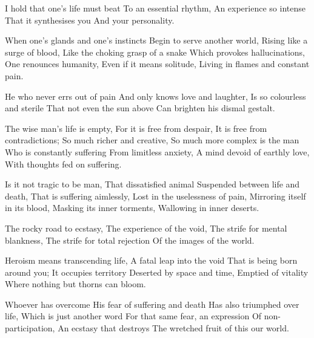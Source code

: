 \documentclass{article}
\newenvironment{stanza}{\begin{minipage}{10cm}\obeylines}{\end{minipage}\vspace{\baselineskip}}
\begin{document}
\begin{stanza}
I hold that one's life must beat
To an essential rhythm,
An experience so intense
That it synthesises you
And your personality.
\end{stanza}

\begin{stanza}
When one's glands and one's instincts 
Begin to serve another world,
Rising like a surge of blood,
Like the choking grasp of a snake
Which provokes hallucinations,
One renounces humanity,
Even if it means solitude,
Living in flames and constant pain.
\end{stanza}

\begin{stanza}
He who never errs out of pain
And only knows love and laughter,
Is so colourless and sterile
That not even the sun above
Can brighten his dismal gestalt.
\end{stanza}

\begin{stanza}
The wise man's life is empty,
For it is free from despair,
It is free from contradictions;
So much richer and creative,
So much more complex is the man
Who is constantly suffering
From limitless anxiety,
A mind devoid of earthly love,
With thoughts fed on suffering.
\end{stanza}

\begin{stanza}
Is it not tragic to be man,
That dissatisfied animal
Suspended between life and death,
That is suffering aimlessly,
Lost in the uselessness of pain,
Mirroring itself in its blood,
Masking its inner torments,
Wallowing in inner deserts.
\end{stanza}

\begin{stanza}
The rocky road to ecstasy,
The experience of the void,
The strife for mental blankness,
The strife for total rejection
Of the images of the world.
\end{stanza}

\begin{stanza}
Heroism means transcending life,
A fatal leap into the void
That is being born around you;
It occupies territory
Deserted by space and time,
Emptied of vitality
Where nothing but thorns can bloom.
\end{stanza}

\begin{stanza}
Whoever has overcome
His fear of suffering and death
Has also triumphed over life,
Which is just another word
For that same fear, an expression
Of non-participation,
An ecstasy that destroys
The wretched fruit of this our world.
\end{stanza}
\end{document}
